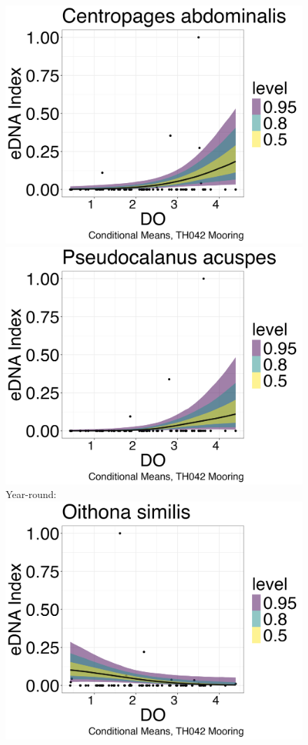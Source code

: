 \documentclass[12pt,twoside]{reedthesis}
\begin{document}
\begin{figure}[h]
\begin{center}
			\includegraphics[scale=0.25]{Cabdominalis_ZOIB_Means_noOut}
			\includegraphics[scale=0.25]{Pacuspes_ZOIB_Means_noOut} \\
			Year-round: \\
			\includegraphics[scale=0.25]{Osimilis_ZOIB_Means_noOut} \\

\end{center}
\end{figure}
\end{document}
